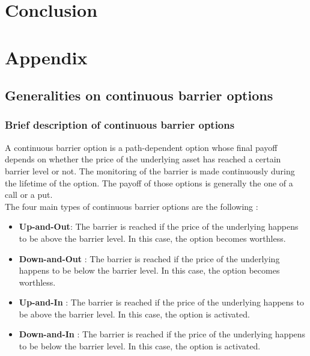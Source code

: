 \documentclass[a4paper,11pt,english]{book}
\let\cleardoublepage\clearpage
\begin{document}
\backmatter
\chapter*{Conclusion}


\newpage
\nocite{*}






\newpage
\begingroup
\let\clearpage\relax
\let\cleardoublepage\relax


\renewcommand{\thesection}{\Alph{section}}
\chapter*{Appendix}
\appendix
{}

\section{Generalities on continuous barrier options}
\label{appendix:down-in-put}

\subsection{Brief description of continuous barrier options}
A continuous barrier option is a path-dependent option whose final payoff depends on whether the price of the underlying asset has reached a certain barrier level or not. The monitoring of the barrier is made continuously during the lifetime of the option. The payoff of those options is generally the one of a call or a put.\\

The four main types of continuous barrier options are the following :
\begin{itemize}
    \item \textbf{Up-and-Out}: The barrier is reached if the price of the underlying happens to be above the barrier level. In this case, the option becomes worthless.
    \item \textbf{Down-and-Out} : The barrier is reached if the price of the underlying happens to be below the barrier level. In this case, the option becomes worthless.
    \item \textbf{Up-and-In} : The barrier is reached if the price of the underlying happens to be above the barrier level. In this case, the option is activated.
    \item \textbf{Down-and-In} : The barrier is reached if the price of the underlying happens to be below the barrier level. In this case, the option is activated.
\end{itemize}
\end{document}
